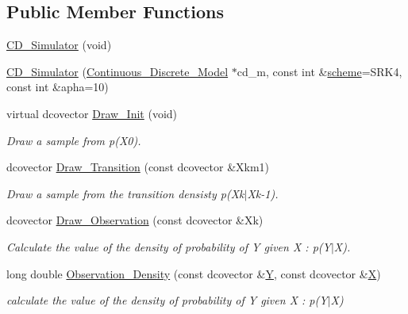 \subsection*{Public Member Functions}
\begin{CompactItemize}
\item 
\hyperlink{class_c_d___simulator_c606f9720c399f258cbe89f24eecf83e}{CD\_\-Simulator} (void)
\item 
\hyperlink{class_c_d___simulator_e0a636e36d9c7821b34271d451b3b5a4}{CD\_\-Simulator} (\hyperlink{class_continuous___discrete___model}{Continuous\_\-Discrete\_\-Model} $\ast$cd\_\-m, const int \&\hyperlink{class_c_d___simulator_a19045bbd5c743d900780338ab355035}{scheme}=SRK4, const int \&apha=10)
\item 
virtual dcovector \hyperlink{class_c_d___simulator_cbdbea3e487026be0c032d2218d27b2b}{Draw\_\-Init} (void)
\begin{CompactList}\small\item\em Draw a sample from p(X0). \item\end{CompactList}\item 
dcovector \hyperlink{class_c_d___simulator_58019a5001ec77da3233b072f6328b30}{Draw\_\-Transition} (const dcovector \&Xkm1)
\begin{CompactList}\small\item\em Draw a sample from the transition densisty p(Xk$|$Xk-1). \item\end{CompactList}\item 
dcovector \hyperlink{class_c_d___simulator_3770eddf939898b6dccc39a556eaf8c9}{Draw\_\-Observation} (const dcovector \&Xk)
\begin{CompactList}\small\item\em Calculate the value of the density of probability of Y given X : p(Y$|$X). \item\end{CompactList}\item 
long double \hyperlink{class_c_d___simulator_905fb2ac4a72f5d7e44957fa8103cab8}{Observation\_\-Density} (const dcovector \&\hyperlink{class_simulator_403a127c909abf3e4c6d48a287315987}{Y}, const dcovector \&\hyperlink{class_simulator_a2db8ace19099d996be516022d230bc0}{X})
\begin{CompactList}\small\item\em calculate the value of the density of probability of Y given X : p(Y$|$X) \item\end{CompactList}\item 

\end{CompactItemize}
